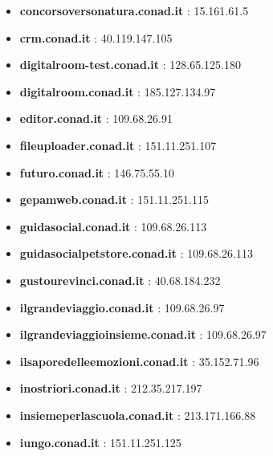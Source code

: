 \documentclass{article}
\begin{document}
\begin{itemize}
            \item \textbf{ concorsoversonatura.conad.it }: 15.161.61.5
        
            \item \textbf{ crm.conad.it }: 40.119.147.105
        
            \item \textbf{ digitalroom-test.conad.it }: 128.65.125.180
        
            \item \textbf{ digitalroom.conad.it }: 185.127.134.97
        
            \item \textbf{ editor.conad.it }: 109.68.26.91
        
            \item \textbf{ fileuploader.conad.it }: 151.11.251.107
        
            \item \textbf{ futuro.conad.it }: 146.75.55.10
        
            \item \textbf{ gepamweb.conad.it }: 151.11.251.115
        
            \item \textbf{ guidasocial.conad.it }: 109.68.26.113
        
            \item \textbf{ guidasocialpetstore.conad.it }: 109.68.26.113
        
            \item \textbf{ gustourevinci.conad.it }: 40.68.184.232
        
            \item \textbf{ ilgrandeviaggio.conad.it }: 109.68.26.97
        
            \item \textbf{ ilgrandeviaggioinsieme.conad.it }: 109.68.26.97
        
            \item \textbf{ ilsaporedelleemozioni.conad.it }: 35.152.71.96
        
            \item \textbf{ inostriori.conad.it }: 212.35.217.197
        
            \item \textbf{ insiemeperlascuola.conad.it }: 213.171.166.88
        
            \item \textbf{ iungo.conad.it }: 151.11.251.125
        

\end{itemize}
\end{document}
